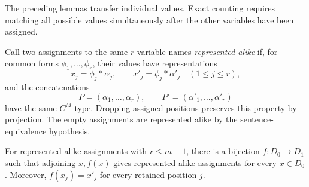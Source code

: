 The preceding lemmas transfer individual values.  Exact counting
requires matching all possible values simultaneously after the other
variables have been assigned.

Call two assignments to the same $r$ variable names
\emph{represented alike} if, for common forms $\phi_1,\ldots,\phi_r$,
their values have representations
\[
 x_j=\phi_j*\alpha_j,\qquad
 x'_j=\phi_j*\alpha'_j \quad(1\leq j\leq r),
\]
and the concatenations
\[
 P=(\alpha_1,\ldots,\alpha_r),\qquad
 P'=(\alpha'_1,\ldots,\alpha'_r)
\]
have the same $C^M$ type.
Dropping assigned positions preserves this property by projection.
The empty assignments are represented alike by the sentence-equivalence
hypothesis.

\begin{lemma}
\label{hf:bijection}
For represented-alike assignments with $r\leq m-1$,
there is a bijection $f:D_0\to D_1$ such that adjoining $x,f(x)$
gives represented-alike assignments for every $x\in D_0$.
Moreover, $f(x_j)=x'_j$ for every retained position $j$.
\end{lemma}


